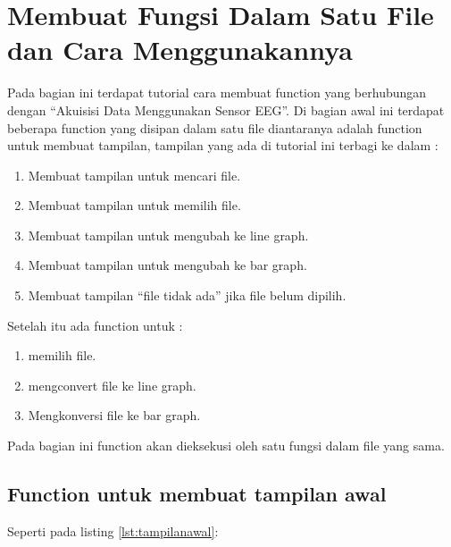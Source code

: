 \section{Membuat Fungsi Dalam Satu File dan Cara Menggunakannya}
Pada bagian ini terdapat tutorial cara membuat function yang berhubungan dengan “Akuisisi Data Menggunakan Sensor EEG”. Di bagian awal ini terdapat beberapa function yang disipan dalam satu file diantaranya adalah function untuk membuat tampilan, tampilan yang ada di tutorial ini terbagi ke dalam :
\begin{enumerate}
\item Membuat tampilan untuk mencari file.
\item Membuat tampilan untuk memilih file.
\item Membuat tampilan untuk mengubah ke line graph.
\item Membuat tampilan untuk mengubah ke bar graph.
\item Membuat tampilan “file tidak ada” jika file belum dipilih.
\end{enumerate}
Setelah itu ada function untuk :
\begin{enumerate} 
\item memilih file.
\item mengconvert file ke line graph.
\item Mengkonversi file ke bar graph.
\end{enumerate}
Pada bagian ini function akan dieksekusi oleh satu fungsi dalam file yang sama.
\subsection{Function untuk membuat tampilan awal}
Seperti pada listing \ref{lst:tampilanawal}:



